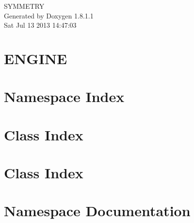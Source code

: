 \documentclass{book}
\begin{document}
\hypersetup{pageanchor=false,citecolor=blue}
\begin{titlepage}
\vspace*{7cm}
\begin{center}
{\Large S\-Y\-M\-M\-E\-T\-R\-Y }\\
\vspace*{1cm}
{\large Generated by Doxygen 1.8.1.1}\\
\vspace*{0.5cm}
{\small Sat Jul 13 2013 14:47:03}\\
\end{center}
\end{titlepage}
\clearemptydoublepage
{}
\tableofcontents
\clearemptydoublepage
{}
\hypersetup{pageanchor=true,citecolor=blue}
\chapter{E\-N\-G\-I\-N\-E}
\label{index}\hypertarget{index}{}
\chapter{Namespace Index}

\chapter{Class Index}

\chapter{Class Index}

\chapter{Namespace Documentation}

\end{document}
